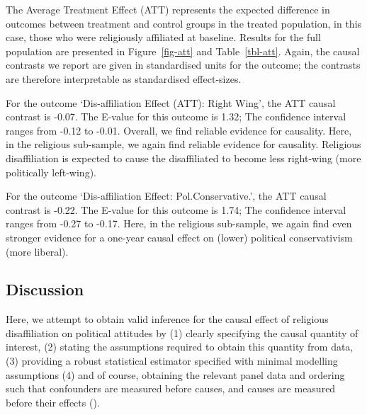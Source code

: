 \documentclass[
  singlecolumn]{article}
\begin{document}
\begin{table}

\caption{\label{tbl-att}}

\centering{

\captionsetup{labelsep=none}

}

\end{table}%

The Average Treatment Effect (ATT) represents the expected difference in
outcomes between treatment and control groups in the treated population,
in this case, those who were religiously affiliated at baseline. Results
for the full population are presented in Figure~\ref{fig-att} and
Table~\ref{tbl-att}. Again, the causal contrasts we report are given in
standardised units for the outcome; the contrasts are therefore
interpretable as standardised effect-sizes.

For the outcome `Dis-affiliation Effect (ATT): Right Wing', the ATT
causal contrast is -0.07. The E-value for this outcome is 1.32; The
confidence interval ranges from -0.12 to -0.01. Overall, we find
reliable evidence for causality. Here, in the religious sub-sample, we
again find reliable evidence for causality. Religious disaffiliation is
expected to cause the disaffiliated to become less right-wing (more
politically left-wing).

For the outcome `Dis-affiliation Effect: Pol.Conservative.', the ATT
causal contrast is -0.22. The E-value for this outcome is 1.74; The
confidence interval ranges from -0.27 to -0.17. Here, in the religious
sub-sample, we again find even stronger evidence for a one-year causal
effect on (lower) political conservativism (more liberal).

\subsection{Discussion}\label{discussion}

Here, we attempt to obtain valid inference for the causal effect of
religious disaffiliation on political attitudes by (1) clearly
specifying the causal quantity of interest, (2) stating the assumptions
required to obtain this quantity from data, (3) providing a robust
statistical estimator specified with minimal modelling assumptions (4)
and of course, obtaining the relevant panel data and ordering such that
confounders are measured before causes, and causes are measured before
their effects ().
\end{document}
